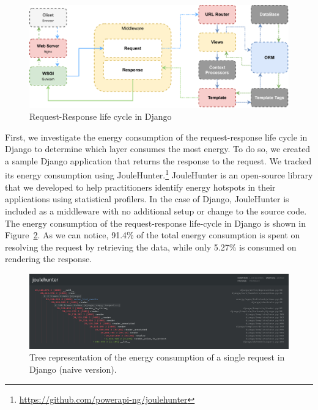 \begin{figure}[!htb]
    \centering
    \includegraphics[width=.9\linewidth]{imgs/django_request_lifecycle}
    \caption{Request-Response life cycle in Django}
    \label{fig:django-life-cycle}
\end{figure}

First, we investigate the energy consumption of the request-response life cycle in Django to determine which layer consumes the most energy.
To do so, we created a sample Django application that returns the response to the request.
We tracked its energy consumption using JouleHunter.\footnote{\url{https://github.com/powerapi-ng/joulehunter}}
JouleHunter is an open-source library that we developed to help practitioners identify energy hotspots in their applications using statistical profilers.
In the case of Django, JouleHunter is included as a middleware with no additional setup or change to the source code.
The energy consumption of the request-response life-cycle in Django is shown in Figure~\ref{fig:django_life_cycle_naive}.
As we can notice, 91.4\% of the total energy consumption is spent on resolving the request by retrieving the data, while only 5.27\% is consumed on rendering the response.

\begin{figure}[!htb]
    \centering
    \includegraphics[width=\linewidth]{imgs/django_life_cycle_naive}
    \caption{Tree representation of the energy consumption of a single request in Django (naive version).}
    \label{fig:django_life_cycle_naive}
\end{figure}

